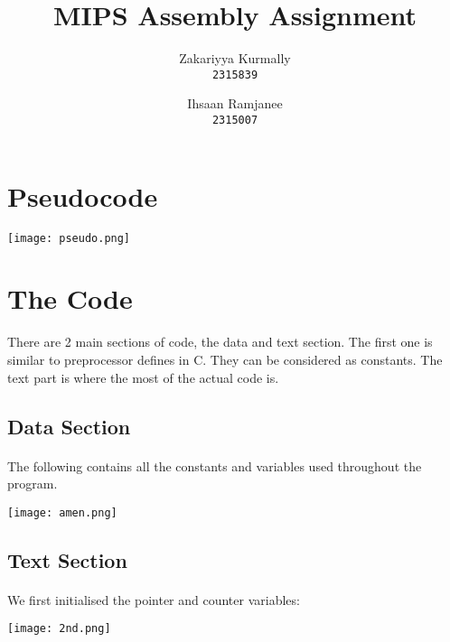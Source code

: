 \documentclass{article}
\title{MIPS Assembly Assignment}
\author{
  Zakariyya Kurmally \\
  \texttt{2315839}
  \and
  Ihsaan Ramjanee \\
  \texttt{2315007}
}
\begin{document}
\maketitle

\pagebreak

\tableofcontents

\pagebreak

\section{Pseudocode}
\begin{center}
  \texttt{[image: pseudo.png]}
\end{center}

\section{The Code}
There are 2 main sections of code, the data and text section. The first
one is similar to preprocessor defines in C. They can be considered as
constants. The text part is where the most of the actual code is. 

\pagebreak

\subsection{Data Section}
\paragraph{}
The following contains all the constants and variables used throughout the 
program. 

\begin{center}
  \texttt{[image: amen.png]}
\end{center}

\subsection{Text Section}
\paragraph{}
We first initialised the pointer and counter variables:

\begin{center}
  \texttt{[image: 2nd.png]}
\end{center}
\end{document}
